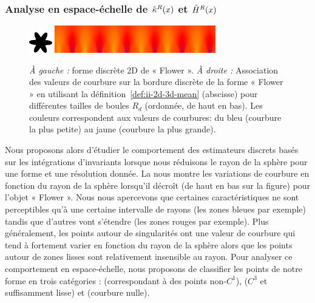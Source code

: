 \subsubsection{Analyse en espace-échelle de $\tilde{\kappa}^{R}(x)$ et $\tilde{H}^{R}(x)$}%
\label{sec:applications:feature:II:analyse}
%
\begin{figure}[ht]{
      \begin{center}
          \includegraphics[width=1cm]{images/Flower}
          \includegraphics[width=7cm]{images/ScaleSpace_Flower}
      \end{center}}
%
      \caption[Analyse en espace-échelle de la courbure en fonction du rayon sur la forme discrète 2D de « Flower »]
      {\emph{À gauche :} forme discrète 2D de « Flower ». \emph{À droite :}
      Association des valeurs de courbure sur la bordure discrète de la forme «
      Flower » en utilisant la définition~\ref{def:ii-2d-3d-mean} (abscisse) pour différentes
      tailles de boules $R_d$ (ordonnée, de haut en bas). Les couleurs correspondent
      aux valeurs de courbures: du bleu (courbure la plus petite) au jaune (courbure
      la plus grande).\label{fig:curvature-scale-2d}}
\end{figure}
%
Nous proposons alors d'étudier le comportement des estimateurs discrets basés
sur les intégrations d'invariants lorsque nous réduisons le rayon de la sphère
pour une forme et une résolution donnée. La 
nous montre les variations de courbure en fonction du rayon de la sphère
lorsqu'il décroît (de haut en bas sur la figure) pour l'objet « Flower ». Nous
nous apercevons que certaines caractéristiques ne sont perceptibles qu'à une
certaine intervalle de rayons (les zones bleues par exemple) tandis que d'autres
vont s'étendre (les zones rouges par exemple). Plus généralement, les points
autour de singularités ont une valeur de courbure qui tend à fortement varier en
fonction du rayon de la sphère alors que les points autour de zones lisses sont
relativement insensible au rayon. Pour analyser ce comportement en
espace-échelle, nous proposons de classifier les points de notre forme en trois
catégories : \featedge (correspondant à des points non-$C^1$), \featsmooth
($C^3$ et suffisamment lisse) et \featflat (courbure nulle).
